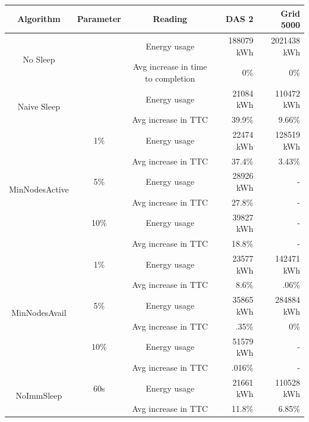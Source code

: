 \begin{table}
    \centering
    \begin{tabular}{|c|c|c|r|r|}
        \hline
        Algorithm & Parameter & Reading & DAS 2 & Grid 5000 \\
        \hline
        \multirow{2}{*}{No Sleep} &  & Energy usage & 188079 kWh & 2021438 kWh \\\cline{3-5}
        & & Avg increase in time to completion & 0\% & 0\% \\
        \hline
        \multirow{2}{*}{Naive Sleep} & & Energy usage & 21084 kWh & 110472 kWh \\\cline{3-5}
        & & Avg increase in TTC & 39.9\% & 9.66\% \\
        \hline
        \multirow{6}{*}{MinNodesActive} & 1\% & Energy usage & 22474 kWh & 128519 kWh\\\cline{3-5}
        & & Avg increase in TTC & 37.4\% & 3.43\% \\\cline{2-5}
        
        & 5\% & Energy usage & 28926 kWh & - \\\cline{3-5}
        & & Avg increase in TTC & 27.8\% & - \\\cline{2-5}
        
        & 10\% & Energy usage & 39827 kWh & - \\\cline{3-5}
        & & Avg increase in TTC & 18.8\% & - \\\cline{2-5}
        \hline
        
        \multirow{6}{*}{MinNodesAvail} & 1\% & Energy usage & 23577 kWh & 142471 kWh \\\cline{3-5}
        & & Avg increase in TTC & 8.6\% & .06\% \\\cline{2-5}
        
        & 5\% & Energy usage & 35865 kWh & 284884 kWh \\\cline{3-5}
        & & Avg increase in TTC & .35\% & 0\% \\\cline{2-5}
        
        & 10\% & Energy usage & 51579 kWh & - \\\cline{3-5}
        & & Avg increase in TTC & .016\% & - \\\cline{2-5}
        \hline
        
        \multirow{6}{*}{NoImmSleep} & 60s & Energy usage & 21661 kWh & 110528 kWh \\\cline{3-5}
        & & Avg increase in TTC & 11.8\% & 6.85\% \\\cline{2-5}
        

\end{tabular}
\end{table}
